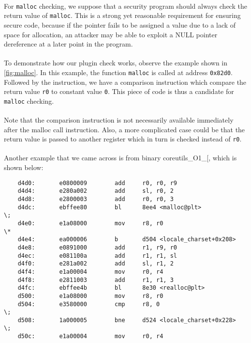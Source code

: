 \paragraph{}
For \texttt{malloc} checking, we suppose that a security program should always check the
return value of \texttt{malloc}. This is a strong yet reasonable requirement
for ensuring secure code, because if the pointer fails to be assigned a value
due to a lack of space for allocation, an attacker may be able to
exploit a NULL pointer dereference at a later point in the program.

\paragraph{}
To demonstrate how our plugin check works, observe the example shown in
\ref{fig:malloc}. In this example, the function \texttt{malloc} is called at
address \texttt{0x82d0}. Followed by the instruction, we have a comparison
instruction which compare the return value \texttt{r0} to constant value
\texttt{0}. This piece of code is thus a candidate for \texttt{malloc}
checking.

\paragraph{}
Note that the comparison instruction is not necessarily available immediately after
the malloc call instruction. Also, a more complicated case could be that the
return value is passed to another register which in turn is checked
instead of \texttt{r0}.

\paragraph{}
Another example that we came across is from binary coreutils\_O1\_[, which is
shown below:

\begin{center}
\lstset{language=C,
caption=Malloc disassembly, breaklines=true, basicstyle=\tiny, numbers=none}
\begin{lstlisting}
    d4d0:       e0800009        add     r0, r0, r9
    d4d4:       e280a002        add     sl, r0, 2
    d4d8:       e2800003        add     r0, r0, 3
    d4dc:       ebffee80        bl      8ee4 <malloc@plt>             \;
    d4e0:       e1a08000        mov     r8, r0                        \*
    d4e4:       ea000006        b       d504 <locale_charset+0x208>
    d4e8:       e0891000        add     r1, r9, r0
    d4ec:       e081100a        add     r1, r1, sl
    d4f0:       e281a002        add     sl, r1, 2
    d4f4:       e1a00004        mov     r0, r4
    d4f8:       e2811003        add     r1, r1, 3
    d4fc:       ebffee4b        bl      8e30 <realloc@plt>
    d500:       e1a08000        mov     r8, r0
    d504:       e3580000        cmp     r8, 0                         \;
    d508:       1a000005        bne     d524 <locale_charset+0x228>   \;
    d50c:       e1a00004        mov     r0, r4
\end{lstlisting}
\end{center}

